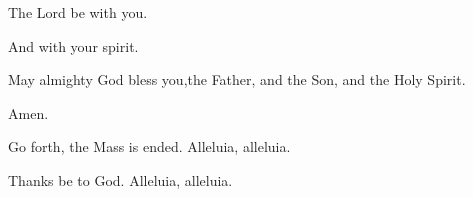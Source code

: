 \pr The Lord be with you.

\be And with your spirit.

\pr May almighty God bless you,the Father, and the Son, and the Holy Spirit.

\be Amen.

\pr Go forth, the Mass is ended. Alleluia, alleluia.

\be Thanks be to God. Alleluia, alleluia.